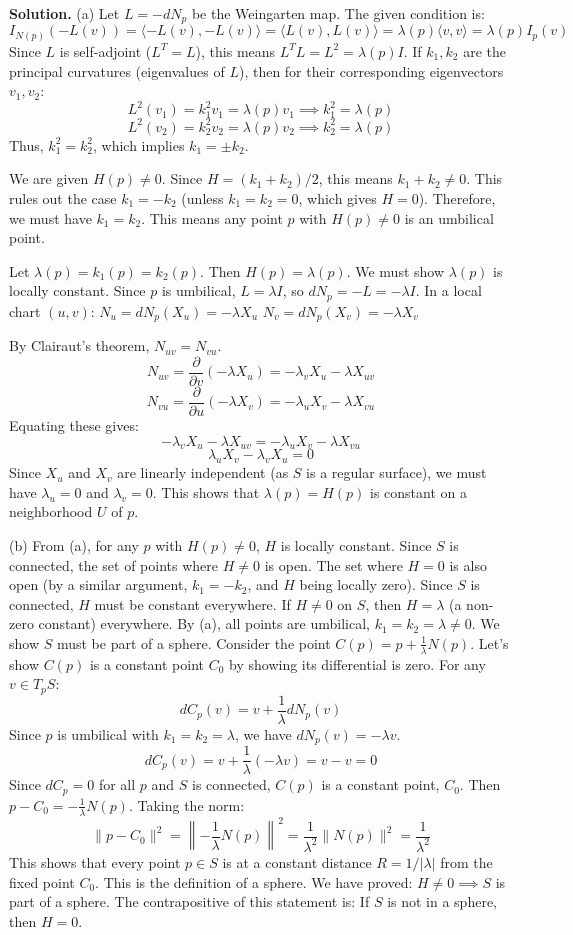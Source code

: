 \documentclass[12pt, a4paper, oneside]{article}
\newenvironment{solution}
  {\par\noindent\textbf{Solution. }\newline}
  {\par}
\begin{document}
\begin{solution}
(a) Let $L = -dN_p$ be the Weingarten map. The given condition is:
\[ I_{N(p)}(-L(v)) = \langle -L(v), -L(v) \rangle = \langle L(v), L(v) \rangle = \lambda(p) \langle v, v \rangle = \lambda(p) I_p(v) \]
Since $L$ is self-adjoint ($L^T = L$), this means $L^T L = L^2 = \lambda(p)I$.
If $k_1, k_2$ are the principal curvatures (eigenvalues of $L$), then for their corresponding eigenvectors $v_1, v_2$:
\[ L^2(v_1) = k_1^2 v_1 = \lambda(p) v_1 \implies k_1^2 = \lambda(p) \]
\[ L^2(v_2) = k_2^2 v_2 = \lambda(p) v_2 \implies k_2^2 = \lambda(p) \]
Thus, $k_1^2 = k_2^2$, which implies $k_1 = \pm k_2$.

We are given $H(p) \ne 0$. Since $H = (k_1+k_2)/2$, this means $k_1+k_2 \ne 0$. This rules out the case $k_1 = -k_2$ (unless $k_1=k_2=0$, which gives $H=0$).
Therefore, we must have $k_1 = k_2$. This means any point $p$ with $H(p) \ne 0$ is an umbilical point.

Let $\lambda(p) = k_1(p) = k_2(p)$. Then $H(p) = \lambda(p)$. We must show $\lambda(p)$ is locally constant.
Since $p$ is umbilical, $L = \lambda I$, so $dN_p = -L = -\lambda I$.
In a local chart $(u,v)$:
$N_u = dN_p(X_u) = -\lambda X_u$
$N_v = dN_p(X_v) = -\lambda X_v$

By Clairaut's theorem, $N_{uv} = N_{vu}$.
\[ N_{uv} = \frac{\partial}{\partial v}(-\lambda X_u) = -\lambda_v X_u - \lambda X_{uv} \text{} \]
\[ N_{vu} = \frac{\partial}{\partial u}(-\lambda X_v) = -\lambda_u X_v - \lambda X_{vu} \text{} \]
Equating these gives:
\[ -\lambda_v X_u - \lambda X_{uv} = -\lambda_u X_v - \lambda X_{vu} \]
\[ \lambda_u X_v - \lambda_v X_u = 0 \text{} \]
Since $X_u$ and $X_v$ are linearly independent (as $S$ is a regular surface), we must have $\lambda_u = 0$ and $\lambda_v = 0$.
This shows that $\lambda(p) = H(p)$ is constant on a neighborhood $U$ of $p$.

(b) From (a), for any $p$ with $H(p) \ne 0$, $H$ is locally constant. Since $S$ is connected, the set of points where $H \ne 0$ is open. The set where $H=0$ is also open (by a similar argument, $k_1=-k_2$, and $H$ being locally zero). Since $S$ is connected, $H$ must be constant everywhere.
If $H \ne 0$ on $S$, then $H = \lambda$ (a non-zero constant) everywhere. By (a), all points are umbilical, $k_1 = k_2 = \lambda \ne 0$.
We show $S$ must be part of a sphere. Consider the point $C(p) = p + \frac{1}{\lambda} N(p)$.
Let's show $C(p)$ is a constant point $C_0$ by showing its differential is zero. For any $v \in T_pS$:
\[ dC_p(v) = v + \frac{1}{\lambda} dN_p(v) \]
Since $p$ is umbilical with $k_1=k_2=\lambda$, we have $dN_p(v) = -\lambda v$.
\[ dC_p(v) = v + \frac{1}{\lambda}(-\lambda v) = v - v = 0 \]
Since $dC_p = 0$ for all $p$ and $S$ is connected, $C(p)$ is a constant point, $C_0$.
Then $p - C_0 = -\frac{1}{\lambda} N(p)$. Taking the norm:
\[ \|p - C_0\|^2 = \left\|-\frac{1}{\lambda} N(p)\right\|^2 = \frac{1}{\lambda^2} \|N(p)\|^2 = \frac{1}{\lambda^2} \]
This shows that every point $p \in S$ is at a constant distance $R = 1/|\lambda|$ from the fixed point $C_0$. This is the definition of a sphere.
We have proved: $H \ne 0 \implies S$ is part of a sphere.
The contrapositive of this statement is: If $S$ is not in a sphere, then $H=0$.
\end{solution}
\end{document}
